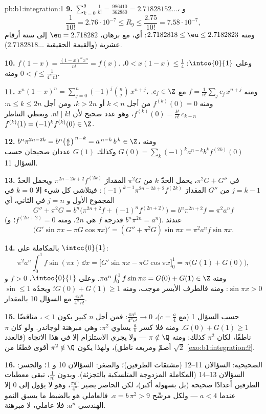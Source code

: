 \begin{solution}{pb:b1:integration:1}
\textbf{9.} $\sum_{k=0}^{9} \frac{1}{k!} = \frac{986410}{362880}
= 2.71828152\dots$، و
\[
\frac{1}{10!} = 2.76\cdot10^{-7} \leq R_9 \leq
\frac{2.75}{10!} = 7.58\cdot10^{-7} ,
\]
ومنه $2.7182818 \leq \eu \leq 2.7182823$: أي، مع برهان، $\eu =
2.718282$ إلى ستة أرقام عشرية (والقيمة الحقيقية $2.7182818\dots$).

\textbf{10.} $f(1 - x) = \frac{(1-x)^n x^n}{n!} = f(x)$. وعلى
$\intoo{0}{1}$: $0 < x(1-x) \leq \frac14$، ومنه $0 < f \leq
\frac{1}{4^n\,n!}$.

\textbf{11.} $x^n(1-x)^n = \sum_{j=0}^{n} (-1)^j\binom
nj\,x^{n+j}$، ومنه $f = \frac{1}{n!}\sum_j c_j\,x^{n+j}$ مع
$c_j \in \Z$. ومنه $f^{(k)}(0) = 0$ من أجل $k < n$ أو $k > 2n$،
ومن أجل $n \leq k \leq 2n$: $f^{(k)}(0) = \frac{k!}{n!}\,
c_{k-n}$، وهو عدد صحيح لأن $n! \mid k!$. ويعطي التناظر
$f^{(k)}(1) = (-1)^k f^{(k)}(0) \in \Z$.

\textbf{12.} $b^n \pi^{2n-2k} = b^n\bigl(\frac
ab\bigr)^{\,n-k} = a^{\,n-k}\,b^{\,k} \in \Z$، ومنه $G(0) =
\sum_k (-1)^k a^{n-k} b^k f^{(2k)}(0)$ وكذلك $G(1)$ عددان
صحيحان حسب السؤال 11.

\textbf{13.} في $\pi^2 G + G''$، يحمل الحدّ $k$ من $\pi^2 G$
المقدارَ $\pi^{2n-2k+2}f^{(2k)}$ ويحمل الحدّ $j = k - 1$ من
$G''$ المقدارَ $(-1)^{k-1}\pi^{2n-2k+2}f^{(2k)}$: فيتلاشى كل شيء
إلا $k = 0$ في المجموع الأول و $j = n$ في
الثاني، أي
\[
G'' + \pi^2 G = b^n\bigl(\pi^{2n+2} f + (-1)^n f^{(2n+2)}\bigr)
= b^n \pi^{2n+2} f = \pi^2 a^n f
\]
(فدرجة $f$ هي $2n$، ومنه $f^{(2n+2)} = 0$؛ و $b^n\pi^{2n} =
a^n$). عندئذ
\[
\bigl(G'\sin\pi x - \pi G\cos\pi x\bigr)'
= (G'' + \pi^2 G)\sin \pi x = \pi^2 a^n f\sin\pi x .
\]

\textbf{14.} بالمكاملة على $\intcc{0}{1}$:
\[
\pi^2 a^n \int_0^1 f\sin(\pi x)\,\dd x
= \bigl[G'\sin\pi x - \pi G\cos\pi x\bigr]_0^1
= \pi\bigl(G(1) + G(0)\bigr) ,
\]
ومنه $\pi a^n \int_0^1 f\sin\pi x = G(0) + G(1) \in \Z$. وعلى
$\intoo{0}{1}$، $f > 0$ و $\sin\pi x > 0$: ومنه فالطرف الأيسر
موجب، ومنه $G(0) + G(1) \geq 1$؛ ويحدّه $\sin \leq 1$ مع
السؤال 10 بالمقدار $\frac{\pi a^n}{4^n\,n!}$.

\textbf{15.} حسب السؤال 1 (مع $c = \frac a4$)،
$\frac{\pi a^n}{4^n n!} \to 0$: فمن أجل $n$ كبير يكون $< 1$،
مناقضًا $G(0) + G(1) \geq 1$. ومنه فلا كسر $\frac ab$
يساوي $\pi^2$: وهي مبرهنة لوجاندر. ولو كان $\pi$ ناطقًا،
لكان $\pi^2$ كذلك: ومنه $\pi \notin \Q$ --- ولا يجري الاستلزام
إلا في هذا الاتجاه (فالعدد $\sqrt2$ أصمّ ومربعه
ناطق)، ولهذا يكون $\pi^2 \notin \Q$ أقوى قطعًا
من \cref{exo:b1:integration:9}.

\textbf{16.} الصحيحية: السؤالان 11--12 (مشتقات
الطرفين)؛ والصغر: السؤالان 10 و 1؛ والجسر: السؤالان
13--14 (المكاملة المزدوجة المتلسكبة بالتجزئة). وبدون
$\frac{1}{n!}$، تبقى معطيات الطرفين أعدادًا صحيحة (بل بسهولة
أكبر)، لكن الحاصر يصير $\frac{\pi a^n}{4^n}$، وهو
لا يؤول إلى $0$ إلا عندما $a < 4$ --- ولكل مرشّح $a =
b\,\pi^2 > 9$. فالعاملي هو بالضبط ما يسبق
النمو الهندسي $a^n$: فلا عاملي، لا مبرهنة.


\end{solution}
